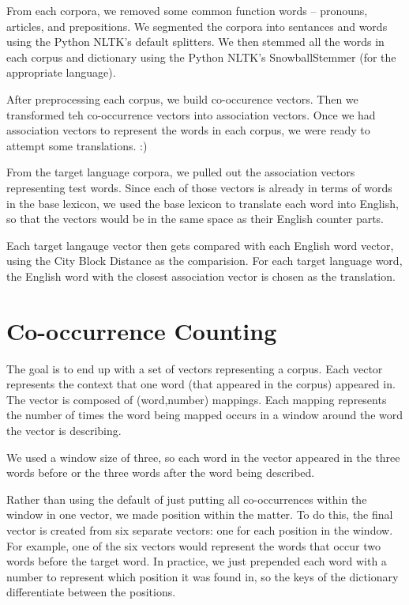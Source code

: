 \documentclass[12pt]{article}
\begin{document}
From each corpora, we removed some common function words -- pronouns, articles,
and prepositions. We segmented the corpora into sentances and words using the
Python NLTK's default splitters. We then stemmed all the words in each corpus
and dictionary using the Python NLTK's SnowballStemmer (for the appropriate
language).

After preprocessing each corpus, we build co-occurence vectors. Then we
transformed teh co-occurrence vectors into association vectors. Once we had
association vectors to represent the words in each corpus, we were ready to
attempt some translations. :)


From the target language corpora, we pulled out the association vectors
representing test words. Since each of those vectors is already in terms of
words in the base lexicon, we used the base lexicon to translate each word into
English, so that the vectors would be in the same space as their English counter
parts.

Each target langauge vector then gets compared with each English word vector,
using the City Block Distance as the comparision. For each target language word,
the English word with the closest association vector is chosen as the
translation.

\section{Co-occurrence Counting}


The goal is to end up with a set of vectors representing a corpus. Each vector
represents the context that one word (that appeared in the corpus) appeared in.
The vector is composed of (word,number) mappings. Each mapping represents the
number of times the word being mapped occurs in a window around the word the
vector is describing.

We used a window size of three, so each word in the
vector appeared in the three words before or the three words after the word
being described.

Rather than using the default of just putting all co-occurrences within the
window in one vector, we made position within the matter. To do this, the
final vector is created from six separate vectors: one for each position in
the window. For example, one of the six vectors would represent the words that
occur two words before the target word. In practice, we just prepended each
word with a number to represent which position it was found in, so the keys of
the dictionary differentiate between the positions.
\end{document}
